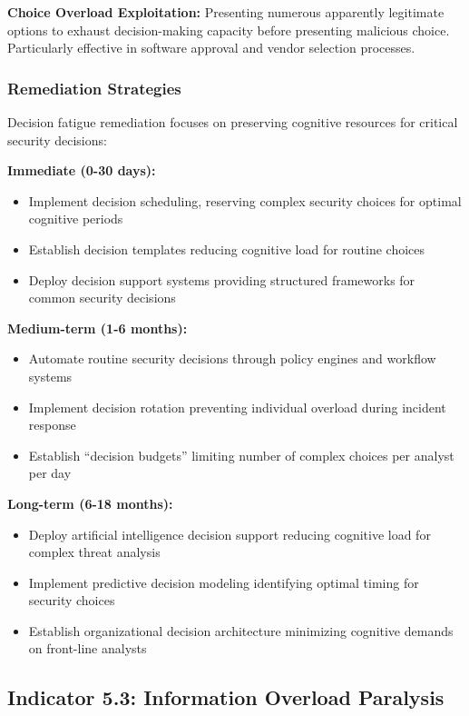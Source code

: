 \documentclass[11pt,a4paper]{article}
\begin{document}
\textbf{Choice Overload Exploitation:} Presenting numerous apparently legitimate options to exhaust decision-making capacity before presenting malicious choice. Particularly effective in software approval and vendor selection processes.

\subsubsection{Remediation Strategies}

Decision fatigue remediation focuses on preserving cognitive resources for critical security decisions:

\textbf{Immediate (0-30 days):}
\begin{itemize}
\item Implement decision scheduling, reserving complex security choices for optimal cognitive periods
\item Establish decision templates reducing cognitive load for routine choices
\item Deploy decision support systems providing structured frameworks for common security decisions
\end{itemize}

\textbf{Medium-term (1-6 months):}
\begin{itemize}
\item Automate routine security decisions through policy engines and workflow systems
\item Implement decision rotation preventing individual overload during incident response
\item Establish ``decision budgets'' limiting number of complex choices per analyst per day
\end{itemize}

\textbf{Long-term (6-18 months):}
\begin{itemize}
\item Deploy artificial intelligence decision support reducing cognitive load for complex threat analysis
\item Implement predictive decision modeling identifying optimal timing for security choices
\item Establish organizational decision architecture minimizing cognitive demands on front-line analysts
\end{itemize}

\subsection{Indicator 5.3: Information Overload Paralysis}
\end{document}
